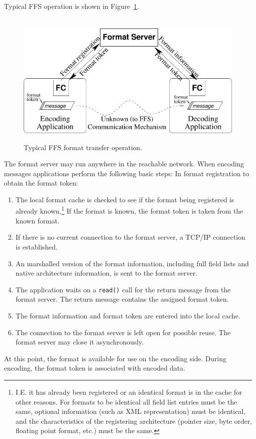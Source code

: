 Typical
FFS operation is shown in Figure~\ref{fig:server}.
\begin{figure}[tb]
\begin{center}\
\includegraphics[width=6.3in]{server.pdf}
\caption{Typical FFS format transfer operation.\label{fig:server}}
\end{center}
\end{figure}
The format server may run anywhere in the reachable network.  When encoding
messages applications perform the following basic steps:
In format registration to obtain the format token:
\begin{enumerate}
\item The local format cache is checked to see if the format being
registered is already known.\footnote{I.E. it has already been registered or
an identical format is in the cache for other reasons.  For formats to be
identical all field list entries must be the same, optional information
(such as XML representation) must be identical, and the characteristics of
the registering architecture (pointer size, byte order, floating point
format, etc.) must be the same.}  If the format is known, the format token
is taken from the known format.
\item If there is no current connection to the format server, a TCP/IP
connection is established.
\item An marshalled version of the format information, including full field
lists and native architecture information, is sent to the format server.
\item The application waits on a {\tt read()} call for the return message
from the format server.  The return message contains the assigned format
token.
\item The format information and format token are entered into the local
cache. 
\item The connection to the format server is left open for possible reuse.
The format server may close it asynchronously.
\end{enumerate}
At this point, the format is available for use on the encoding side.  During
encoding, the format token is associated with encoded data.

